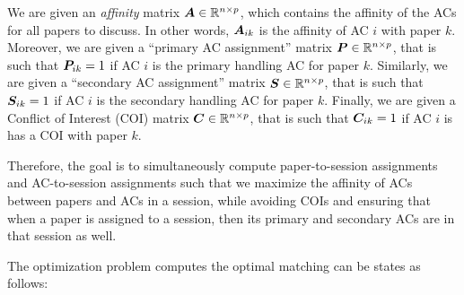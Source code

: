 \documentclass[journal, onecolumn]{IEEEtran}
\begin{document}
We are given an \emph{affinity} matrix ${\bm A} \in { {\mathbb R}^{n \times p} }$, which contains the affinity of the ACs for all papers to discuss. In other words, 
${\bm A}_{ik}$ is the affinity of AC $i$ with paper $k$. 
Moreover, we are given a ``primary AC assignment'' matrix  ${\bm P} \in { {\mathbb R}^{n \times p} }$, that is such that ${\bm P}_{ik} = 1$ if AC $i$ is the primary handling AC for paper $k$.
 Similarly, we are given a ``secondary AC assignment'' matrix  ${\bm S} \in { {\mathbb R}^{n \times p} }$, that is such that ${\bm S}_{ik} = 1$ if AC $i$ is the secondary handling AC for paper $k$.
Finally, we are given a Conflict of Interest (COI) matrix ${\bm C} \in { {\mathbb R}^{n \times p} }$, that is such that ${\bm C}_{ik} = 1$ if AC $i$ is has a COI with paper $k$.
 
 Therefore, the goal is to simultaneously compute paper-to-session assignments and AC-to-session assignments such that we maximize the affinity of ACs between papers and ACs in a session, while avoiding COIs and ensuring that when a paper is assigned to a session, then its primary and secondary ACs are in that session as well.

 The optimization problem computes the optimal matching can be states as follows:
\end{document}
